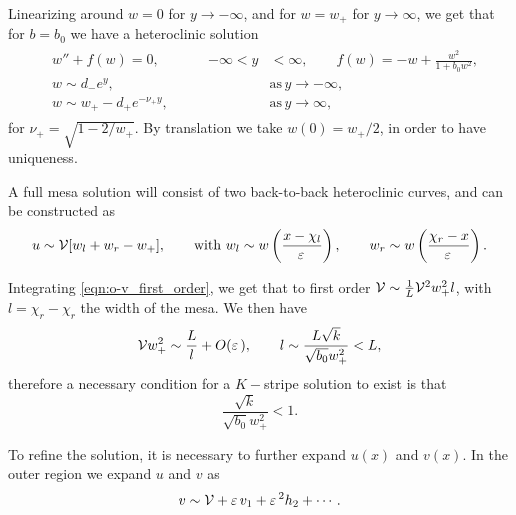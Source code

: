 Linearizing around $w=0$ for $y\rightarrow -\infty$, and for $w=w_+$ for $y\rightarrow \infty$, we get that for $b=b_0$ we have a heteroclinic solution 
% 
\begin{equation*}
\begin{split}
\begin{aligned}
  &w''+f(w)=0,\qquad &-\infty<y&<\infty,\qquad f(w) = -w + \frac{w^2}{1+b_0w^2},\\
  &w\sim d_-e^y,\qquad &&\mathrm{as}\hspace{2pt}y\rightarrow -\infty,\\
  &w\sim w_+ - d_+e^{-\nu_+y},\qquad&&\mathrm{as}\hspace{2pt}y\rightarrow \infty,
\end{aligned}
\end{split}
\end{equation*}
% 
for $\nu_+ = \sqrt{1-2/w_+}$. By translation we take $w(0)=w_+/2$, in order to have uniqueness.

A full mesa solution will consist of two back-to-back heteroclinic curves, and can be constructed as
% 
\begin{equation*}
  u\sim \mathcal{V}[w_l + w_r - w_+],\qquad  \textrm{with }w_l\sim w\left(\frac{x-\chi_l}{\varepsilon\,}\right),\qquad w_r\sim w\left(\frac{\chi_r-x}{\varepsilon\,}\right).
\end{equation*}
% 

Integrating \eqref{eqn:o-v_first_order}, we get that to first order $\mathcal{V}\sim\frac{1}{L}\mathcal{V}^2w_+^2l$, with $l=\chi_r-\chi_r$ the width of the mesa. We then have
% 
\begin{equation*}
  \mathcal{V} w_+^2\sim\frac{L}{l} + O(\varepsilon\,),\qquad l\sim\frac{L\sqrt{k}}{\sqrt{b_0}w_+^2}<L,
\end{equation*}
% 
therefore a necessary condition for a $K-$stripe solution to exist is that 
% 
\begin{equation*}
  \frac{\sqrt{k}}{\sqrt{b_0}w_+^2}<1.
\end{equation*}
% 

To refine the solution, it is necessary to further expand $u(x)$ and $v(x)$. In the outer region we expand $u$ and $v$ as
$$
v\sim \mathcal{V} + \varepsilon\, v_1 + \varepsilon\,^2 h_2 + \cdots.
$$

